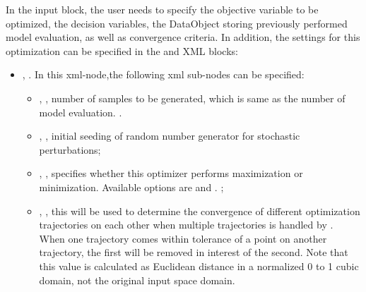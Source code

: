 In the  input block, the user needs to specify the objective variable to be optimized, the decision variables, the
DataObject storing previously performed model evaluation, as well as convergence criteria. In addition, the settings for this
optimization can be specified in the  and  XML blocks:
\begin{itemize}
\item {},  . In this xml-node,the following xml sub-nodes can be
specified:
  \begin{itemize}
    \item {}, , number of samples to be generated, which is same as the number of
    model evaluation. .
    \item {}, , initial seeding of random number generator for stochastic
    perturbations;
    \item {},  , specifies whether this optimizer performs maximization
    or minimization. Available options are  and .
    ;
    \item {}, , this will be used to determine the convergence of different
    optimization trajectories on each other when multiple trajectories is handled by .  When one
    trajectory comes within tolerance of a point on another trajectory, the first will be removed in interest
    of the second.  Note that this value is
    calculated as Euclidean distance in a normalized 0 to 1 cubic domain, not the original input space domain.
  \end{itemize}
\end{itemize}
